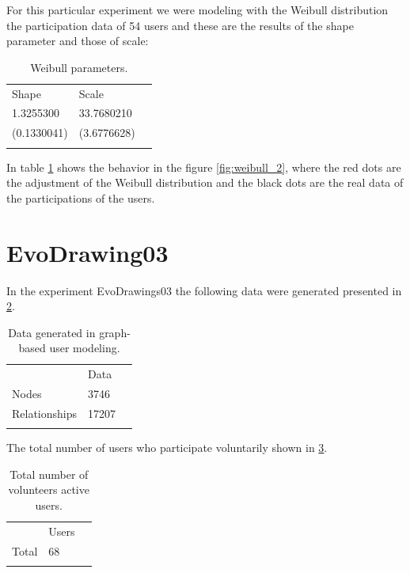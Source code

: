 For this particular experiment we were modeling with the Weibull distribution \cite{weibull1951wide}
the participation data of 54 users and these are the results of the shape parameter
and those of scale:

\begin{table}
\small
\caption{Weibull parameters.}
\label{tab:weibullp_2}
\centering
\small
\begin{tabular}{p{3cm} p{3cm} p{3cm} }
\hline\noalign{\smallskip}
Shape  & Scale &  \\
\noalign{\smallskip}\hline\noalign{\smallskip}
\small{1.3255300} & \small{33.7680210} & \\ \hline
\small{(0.1330041)} & \small{(3.6776628)} & \\ \hline

\noalign{\smallskip}\hline
\end{tabular}
\end{table}

In table \ref{tab:weibullp_2} shows the behavior in the figure
\ref{fig:weibull_2}, where the red dots are the adjustment of the Weibull
distribution and the black dots are the real data of the participations of the
users.




\section{EvoDrawing03} In the experiment EvoDrawings03 the following data were
generated presented in \ref{tab:dataGenerated_3}.

\begin{table}
\small
\caption{Data generated in graph-based user modeling.}
\label{tab:dataGenerated_3}
\centering
\small
\begin{tabular}{p{3cm} p{3cm} p{3cm} }
\hline\noalign{\smallskip}
  & Data &  \\
\noalign{\smallskip}\hline\noalign{\smallskip}
\small{Nodes} & \small{3746 } & \\ \hline
\small{Relationships} & \small{17207 } & \\ \hline

\noalign{\smallskip}\hline
\end{tabular}
\end{table}

The total number of users who participate voluntarily shown in \ref{tab:totalUsers_3}.

\begin{table}
\small
\caption{Total number of volunteers active users.}
\label{tab:totalUsers_3}
\centering
\small
\begin{tabular}{p{3cm} p{3cm} p{3cm} }
\hline\noalign{\smallskip}
  & Users &  \\
\noalign{\smallskip}\hline\noalign{\smallskip}
\small{Total } & \small{68} & \\ \hline
\noalign{\smallskip}\hline
\end{tabular}
\end{table}

